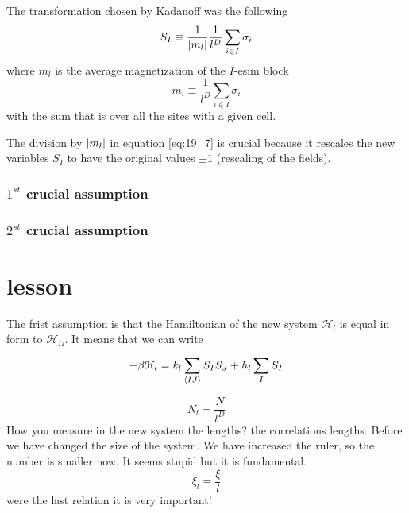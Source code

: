 \documentclass[../main/main.tex]{subfiles}
\begin{document}
The transformation chosen by Kadanoff was the following
\begin{equation}
  S_I \equiv \frac{1}{\abs{m_l} } \frac{1}{l^D} \sum_{i \in I}^{}  \sigma _i
  \label{eq:19_7}
\end{equation}
where \( m_l \) is the average magnetization of the \( I \)-esim block
\begin{equation}
  m_l \equiv \frac{1}{l^D} \sum_{i \in I}^{} \sigma _i
\end{equation}
with the sum that is over all the sites with a given cell.
\begin{remark}
The division by \( \abs{m_l}  \) in equation \eqref{eq:19_7} is crucial because it rescales the new variables \( S_I \) to have the original values \( \pm 1 \) (rescaling of the fields).  
\end{remark}

\subsubsection{\(  1^{st} \) crucial assumption}
\subsubsection{\(  2^{st} \) crucial assumption}


\section{lesson}







The frist assumption is that the Hamiltonian of the new system \( \mathcal{H}_l \) is equal in form to \( \mathcal{H}_ \Omega  \). It means that we can write
\begin{equation}
  - \beta \mathcal{H}_l = k_l \sum_{\expval{IJ} }^{} S_I S_J  + h_l \sum_{I}^{} S_I
\end{equation}

\begin{equation}
  N_l = \frac{N}{l^D}
\end{equation}
How you measure in the new system the lengths? the correlations lengths. Before we have changed the size of the system. We have increased the ruler, so the number is smaller now. It seems stupid but it is fundamental.
\begin{equation}
  \xi _l = \frac{\xi }{l}
\end{equation}
were the last relation it is very important!
\end{document}
